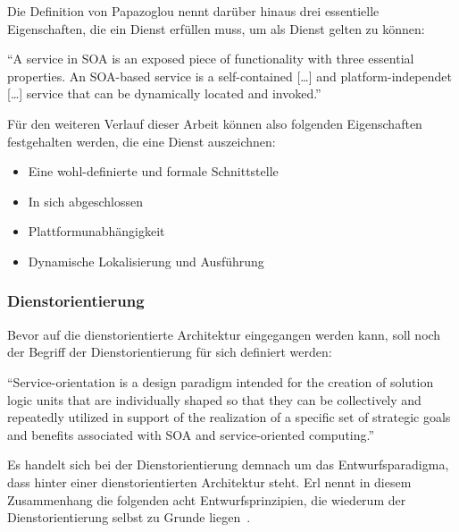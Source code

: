   Die Definition von Papazoglou nennt darüber hinaus drei essentielle Eigenschaften, die ein Dienst erfüllen muss, um als Dienst gelten zu können:

\begin{definition}\label{def:dienst_papazoglou_}
  "`A service in SOA is an exposed piece of functionality with three essential properties. An SOA-based service is a self-contained [\ldots] and platform-independet [\ldots] service that can be dynamically located and invoked."'~\emph{\citep[S. 258]{web_services_principles_and_technology}}
\end{definition}

  Für den weiteren Verlauf dieser Arbeit können also folgenden Eigenschaften festgehalten werden, die eine Dienst auszeichnen:
  
  \begin{itemize}
    \item Eine wohl-definierte und formale Schnittstelle
    \item In sich abgeschlossen
    \item Plattformunabhängigkeit
    \item Dynamische Lokalisierung und Ausführung
  \end{itemize}


\subsubsection{Dienstorientierung} %
\label{ssub:definition_dienstorientierung}

  Bevor auf die dienstorientierte Architektur eingegangen werden kann, soll noch der Begriff der Dienstorientierung für sich definiert werden:

\begin{definition}[Dienstorientierung]\label{def:dienstorientierung}
  "`Service-orientation is a design paradigm intended for the creation of solution logic units that are individually shaped so that they can be collectively and repeatedly utilized in support of the realization of a specific set of strategic goals and benefits associated with SOA and service-oriented computing."'~\emph{\citep{erl2008soa}}
\end{definition}

  Es handelt sich bei der Dienstorientierung demnach um das Entwurfsparadigma, dass hinter einer dienstorientierten Architektur steht. Erl nennt in diesem Zusammenhang die folgenden acht Entwurfsprinzipien, die wiederum der Dienstorientierung selbst zu Grunde liegen~\citep{erl2008soa}.

